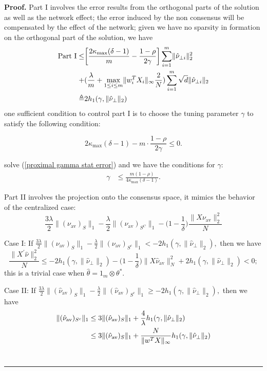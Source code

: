 \documentclass{article}
\theoremstyle{break}
\newenvironment{proof}[1][Proof]{\noindent\textbf{#1.} }{\ \rule{0.5em}{0.5em}}
\newcommand{\T}{\theta}
\begin{document}
\begin{proof}
Part I involves the error results from the orthogonal parts of the solution as well as the network effect; the error induced by the non consensus will be compensated by the effect of the network; given we have no sparsity in formation on the orthogonal part of the solution, we have
\begin{align}\label{median step for next lemma}
    \text{Part I}
    \leq&\bigg[\frac{2\kappa_{\max}(\delta-1)}{m}-\frac{1-\rho}{2\gamma}\bigg]\sum\limits_{i=1}^m\lVert\hat{\nu}_{\perp i}\rVert_2^2\notag\\
    +&(\frac{\lambda}{m}+\max\limits_{1\leq i\leq m}\lVert w_i^T X_i\rVert_{\infty}\frac{2}{N})\sum\limits_{i=1}^m\sqrt{d}\lVert\hat{\nu}_{\perp i}\rVert_2\notag\\
    \triangleq&2h_1(\gamma,\lVert\hat{\nu}_{\perp}\rVert_2)\notag
\end{align}
one sufficient condition to control part I is to choose the tuning parameter $\gamma$ to satisfy the following condition:


\begin{equation}\label{proximal gamma stat error}            
             2\kappa_{\max}(\delta-1)-m\cdot\frac{1-\rho}{2\gamma}\leq 0.
\end{equation}

solve (\ref{proximal gamma stat error}) and we have the conditions for $\gamma:$
\begin{align*}
    \gamma&\leq \frac{m(1-\rho)}{4\kappa_{\max}(\delta-1)}.
\end{align*}



Part II involves the projection onto the consensus space, it mimics the behavior of the centralized case: $$\frac{3\lambda}{2}\lVert(\nu_{\text{av}})_S\rVert_1-\frac{\lambda}{2}\lVert(\nu_{\text{av}})_{S^C}\rVert_1-\bigg(1-\frac{1}{\delta}\bigg)\frac{\lVert X\nu_{\text{av}}\rVert_2^2}{N}$$

Case I: If $\frac{3\lambda}{2}\lVert(\nu_{\text{av}})_{S}\rVert_1-\frac{\lambda}{2}\lVert(\nu_{\text{av}})_{S^c}\rVert_1<-2h_1(\gamma,\lVert\hat{\nu}_{\perp}\rVert_2), $ then we have
\begin{equation*}
    \frac{\lVert X^{'}\hat{\nu}\rVert_2^2}{N}\leq  -2h_1(\gamma,\lVert\hat{\nu}_{\perp}\rVert_2)-\bigg(1-\frac{1}{\delta}\bigg)\lVert X\hat{\nu}_{\text{av}}\rVert_N^2+2h_1(\gamma,\lVert\hat{\nu}_{\perp}\rVert_2)< 0;
\end{equation*}
this is a trivial case when $\hat{\theta}=1_m\otimes \T^*$.

Case II: If $\frac{3\lambda}{2}\lVert(\hat{\nu}_{\text{av}})_{S}\rVert_1-\frac{\lambda}{2}\lVert(\hat{\nu}_{\text{av}})_{S^c}\rVert_1\geq-2h_1(\gamma,\lVert\hat{\nu}_{\perp}\rVert_2), $ then we have
\begin{align}\label{nu_ave sparisty}
    \lVert(\hat{\nu}_{\text{av}})_{S^c}\rVert_1&\leq 3\lVert(\hat{\nu}_{\text{av}})_{S}\rVert_1+\frac{4}{\lambda}h_1(\gamma,\lVert\hat{\nu}_{\perp}\rVert_2)\notag\\
    &\leq3\lVert(\hat{\nu}_{\text{av}})_{S}\rVert_1+ \frac{N}{\lVert w^TX\rVert_{\infty}}h_1(\gamma,\lVert\hat{\nu}_{\perp}\rVert_2)\notag\\
\end{align}
\end{proof}
\end{document}
